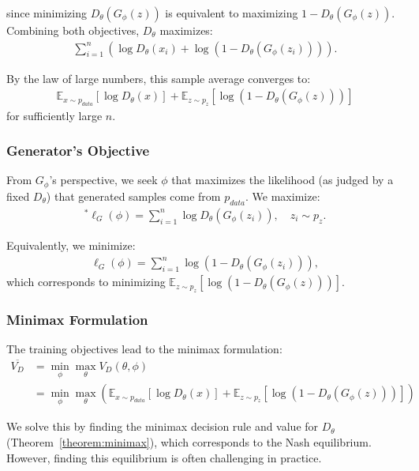since minimizing $D_\theta(G_\phi(z))$ is equivalent to maximizing $1 - D_\theta(G_\phi(z))$. Combining both objectives, $D_\theta$ maximizes:
\begin{align}
  \sum_{i=1}^n \left( \log D_\theta(x_i) + \log(1 - D_\theta(G_\phi(z_i))) \right).
\end{align}

By the law of large numbers, this sample average converges to:
\begin{align}
  \label{eq:objective-for-d}
  \mathbb{E}_{x \sim p_{data}}[\log D_\theta(x)] + \mathbb{E}_{z \sim p_z}[\log(1 - D_\theta(G_\phi(z)))]
\end{align}
for sufficiently large $n$.

\subsubsection{Generator's Objective}%
\label{sec:derivation-g}

From $G_\phi$'s perspective, we seek $\phi$ that maximizes the likelihood (as judged by a fixed $D_\theta$) that generated samples come from $p_{data}$. We maximize:
\begin{align}
  ^*\ell_G(\phi) = \sum_{i=1}^n \log D_\theta(G_\phi(z_i)), \quad z_i \sim p_z.
\end{align}

Equivalently, we minimize:
\begin{align}
  \ell_G(\phi) = \sum_{i=1}^n \log(1 - D_\theta(G_\phi(z_i))),
\end{align}
which corresponds to minimizing $\mathbb{E}_{z \sim p_z}[\log(1 - D_\theta(G_\phi(z)))]$.

\subsubsection{Minimax Formulation}

The training objectives lead to the minimax formulation:
\begin{align}
  \overline{V_D} & = \min_{\phi}\max_{\theta} V_D(\theta, \phi) \\
                  & = \min_{\phi}\max_{\theta} \left( \mathbb{E}_{x \sim p_{data}}[\log D_\theta(x)] + \mathbb{E}_{z \sim p_z}[\log(1 - D_\theta(G_\phi(z)))] \right)
\end{align}

We solve this by finding the minimax decision rule and value for $D_\theta$ (Theorem~\ref{theorem:minimax}), which corresponds to the Nash equilibrium. However, finding this equilibrium is often challenging in practice.


